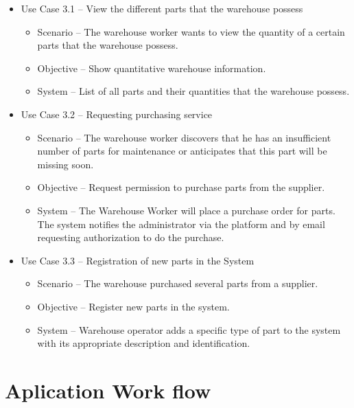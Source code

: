 \begin{itemize}
  \item Use Case 3.1 – View the different parts that the warehouse possess
  \begin{itemize}
    \item Scenario – The warehouse worker wants to view the quantity of a certain parts that the warehouse possess.
    \item Objective – Show quantitative warehouse information.
    \item System – List of all parts and their quantities that the warehouse possess. 
  \end{itemize}
  \item Use Case 3.2 – Requesting purchasing service 
  \begin{itemize}
    \item Scenario – The warehouse worker discovers that he has an insufficient number of parts for maintenance or anticipates that this part will be missing soon.
    \item Objective – Request permission to purchase parts from the supplier.
    \item System – The Warehouse Worker will place a purchase order for parts. The system notifies the administrator via the platform and by email requesting authorization to do the purchase. 
  \end{itemize}
  \item Use Case 3.3 – Registration of new parts in the System
  \begin{itemize}
    \item Scenario – The warehouse purchased several parts from a supplier.
    \item Objective – Register new parts in the system.
    \item System – Warehouse operator adds a specific type of part to the system with its appropriate description and identification.
  \end{itemize}
\end{itemize}
\hfill \break

\section{Aplication Work flow}
